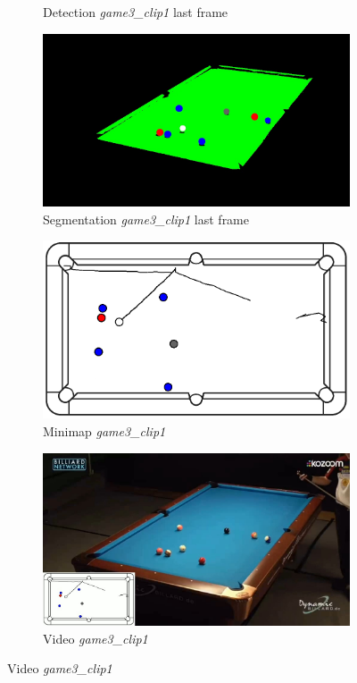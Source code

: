 \begin{figure}[H]
\begin{subfigure}[b]{0.48\textwidth}
		\caption{Detection \textit{game3\_clip1} last frame}
		\label{fig: game3_clip1_last_frame_detected}
	\end{subfigure}
	\begin{subfigure}[b]{0.48\textwidth}
		\centering
		\includegraphics[width=\textwidth]{images/Segmentation/game3_clip1_segmented_balls_last_frame.jpg}
		\caption{Segmentation \textit{game3\_clip1} last frame}
		\label{fig: game3_clip1_last_frame_segmented}
	\end{subfigure}
	\begin{subfigure}[b]{0.48\textwidth}
		\centering
		\includegraphics[width=\textwidth]{images/AllMinimap/game3_clip1_minimap.png}
		\caption{Minimap \textit{game3\_clip1}}
		\label{fig: game3_clip1_minimap}
	\end{subfigure}
	\begin{subfigure}[b]{0.48\textwidth}
		\centering
		\includegraphics[width=\textwidth]{images/Video/game3_clip1_video.jpg}
		\caption{Video \textit{game3\_clip1}}
		\label{fig: game3_clip1_video}
	\end{subfigure}


\end{figure}
